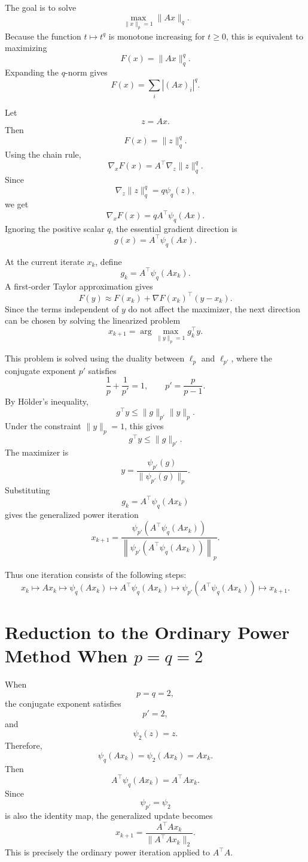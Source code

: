 \documentclass{article}
\begin{document}
The goal is to solve
\[
\max_{\|x\|_p=1}\|Ax\|_q.
\]
Because the function \(t\mapsto t^q\) is monotone increasing for \(t\geq 0\), this is equivalent to maximizing
\[
F(x)=\|Ax\|_q^q.
\]
Expanding the \(q\)-norm gives
\[
F(x)
=
\sum_i |(Ax)_i|^q.
\]

Let
\[
z=Ax.
\]
Then
\[
F(x)=\|z\|_q^q.
\]
Using the chain rule,
\[
\nabla_x F(x)
=
A^\top \nabla_z \|z\|_q^q.
\]
Since
\[
\nabla_z \|z\|_q^q
=
q\psi_q(z),
\]
we get
\[
\nabla_x F(x)
=
qA^\top \psi_q(Ax).
\]
Ignoring the positive scalar \(q\), the essential gradient direction is
\[
g(x)
=
A^\top \psi_q(Ax).
\]

At the current iterate \(x_k\), define
\[
g_k=A^\top \psi_q(Ax_k).
\]
A first-order Taylor approximation gives
\[
F(y)
\approx
F(x_k)+\nabla F(x_k)^\top (y-x_k).
\]
Since the terms independent of \(y\) do not affect the maximizer, the next direction can be chosen by solving the linearized problem
\[
x_{k+1}
=
\arg\max_{\|y\|_p=1} g_k^\top y.
\]

This problem is solved using the duality between \(\ell_p\) and \(\ell_{p'}\), where the conjugate exponent \(p'\) satisfies
\[
\frac{1}{p}+\frac{1}{p'}=1,
\qquad
p'=\frac{p}{p-1}.
\]
By H\"older's inequality,
\[
g^\top y
\leq
\|g\|_{p'}\|y\|_p.
\]
Under the constraint \(\|y\|_p=1\), this gives
\[
g^\top y\leq \|g\|_{p'}.
\]
The maximizer is
\[
y
=
\frac{\psi_{p'}(g)}
{\|\psi_{p'}(g)\|_p}.
\]
Substituting
\[
g_k=A^\top\psi_q(Ax_k)
\]
gives the generalized power iteration
\[
x_{k+1}
=
\frac{
\psi_{p'}
\left(
A^\top \psi_q(Ax_k)
\right)
}{
\left\|
\psi_{p'}
\left(
A^\top \psi_q(Ax_k)
\right)
\right\|_p
}.
\]

Thus one iteration consists of the following steps:
\[
x_k
\longmapsto
Ax_k
\longmapsto
\psi_q(Ax_k)
\longmapsto
A^\top\psi_q(Ax_k)
\longmapsto
\psi_{p'}\left(A^\top\psi_q(Ax_k)\right)
\longmapsto
x_{k+1}.
\]

\section{Reduction to the Ordinary Power Method When \(p=q=2\)}

When
\[
p=q=2,
\]
the conjugate exponent satisfies
\[
p'=2,
\]
and
\[
\psi_2(z)=z.
\]
Therefore,
\[
\psi_q(Ax_k)=\psi_2(Ax_k)=Ax_k.
\]
Then
\[
A^\top\psi_q(Ax_k)
=
A^\top A x_k.
\]
Since
\[
\psi_{p'}=\psi_2
\]
is also the identity map, the generalized update becomes
\[
x_{k+1}
=
\frac{A^\top A x_k}{\|A^\top A x_k\|_2}.
\]
This is precisely the ordinary power iteration applied to \(A^\top A\).
\end{document}
